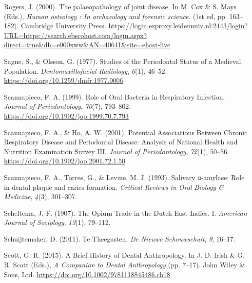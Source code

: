 \documentclass[
  letterpaper,
]{book}
\newlength{\cslhangindent}
\newlength{\cslentryspacingunit} %
\newenvironment{CSLReferences}[2] %
 {%
  \setlength{\parindent}{0pt}
  \ifodd #1
  \let\oldpar\par
  \def\par{\hangindent=\cslhangindent\oldpar}
  \fi
  \setlength{\parskip}{#2\cslentryspacingunit}
 }%
 {}
\begin{document}
\begin{CSLReferences}{1}{0}
\leavevmode{}%
Rogers, J. (2000). The palaeopathology of joint disease. In M. Cox \& S.
Mays (Eds.), \emph{Human osteology : {In} archaeology and forensic
science.} (1st ed, pp. 163--182). {Cambridge University Press}.
\url{https://login.ezproxy.leidenuniv.nl:2443/login?URL=https://search.ebscohost.com/login.aspx?direct=true\&db=e000xww\&AN=40641\&site=ehost-live}

\leavevmode{}%
Sagne, S., \& Olsson, G. (1977). Studies of the {Periodontal Status} of
a {Medieval Population}. \emph{Dentomaxillofacial Radiology},
\emph{6}(1), 46--52. \url{https://doi.org/10.1259/dmfr.1977.0006}

\leavevmode{}%
Scannapieco, F. A. (1999). Role of {Oral Bacteria} in {Respiratory
Infection}. \emph{Journal of Periodontology}, \emph{70}(7), 793--802.
\url{https://doi.org/10.1902/jop.1999.70.7.793}

\leavevmode{}%
Scannapieco, F. A., \& Ho, A. W. (2001). Potential {Associations Between
Chronic Respiratory Disease} and {Periodontal Disease}: {Analysis} of
{National Health} and {Nutrition Examination Survey III}. \emph{Journal
of Periodontology}, \emph{72}(1), 50--56.
\url{https://doi.org/10.1902/jop.2001.72.1.50}

\leavevmode{}%
Scannapieco, F. A., Torres, G., \& Levine, M. J. (1993). Salivary
α-amylase: Role in dental plaque and caries formation. \emph{Critical
Reviews in Oral Biology \& Medicine}, \emph{4}(3), 301--307.

\leavevmode{}%
Scheltema, J. F. (1907). The {Opium Trade} in the {Dutch East Indies}.
{I}. \emph{American Journal of Sociology}, \emph{13}(1), 79--112.

\leavevmode{}%
Schuijtemaker, D. (2011). Te Theegasten. \emph{De Nieuwe Schouwschuit},
\emph{9}, 16--17.

\leavevmode{}%
Scott, G. R. (2015). A {Brief History} of {Dental Anthropology}. In J.
D. Irish \& G. R. Scott (Eds.), \emph{A {Companion} to {Dental
Anthropology}} (pp. 7--17). {John Wiley \& Sons, Ltd}.
\url{https://doi.org/10.1002/9781118845486.ch18}


\end{CSLReferences}
\end{document}
